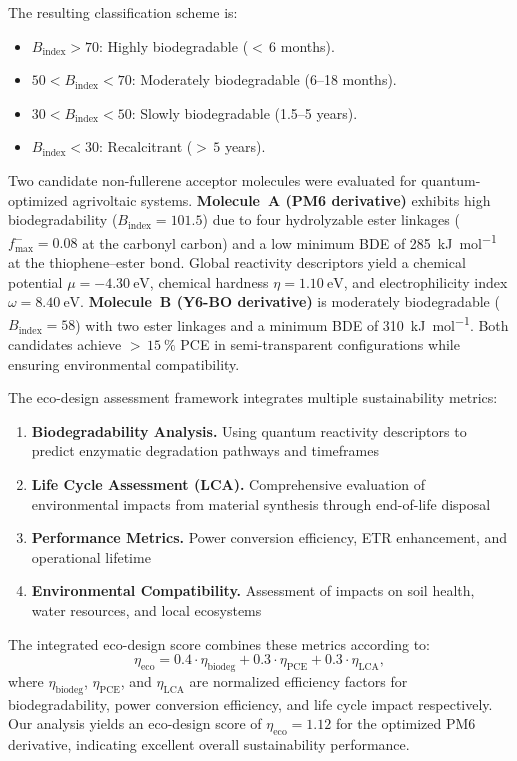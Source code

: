 \documentclass[11pt,a4paper]{article}
\begin{document}
The resulting classification scheme is:
\begin{itemize}
    \item $B_{\mathrm{index}} > 70$: Highly biodegradable (${<}\,6$ months).
    \item $50 < B_{\mathrm{index}} < 70$: Moderately biodegradable (6--18 months).
    \item $30 < B_{\mathrm{index}} < 50$: Slowly biodegradable (1.5--5 years).
    \item $B_{\mathrm{index}} < 30$: Recalcitrant (${>}\,5$ years).
\end{itemize}
Two candidate non-fullerene acceptor molecules were evaluated for quantum-optimized agrivoltaic systems. \textbf{Molecule~A (PM6 derivative)} exhibits high biodegradability ($B_{\mathrm{index}} = 101.5$) due to four hydrolyzable ester linkages ($f^-_{\mathrm{max}} = 0.08$ at the carbonyl carbon) and a low minimum BDE of \SI{285}{\kilo\joule\per\mole} at the thiophene--ester bond. Global reactivity descriptors yield a chemical potential $\mu = \SI{-4.30}{\electronvolt}$, chemical hardness $\eta = \SI{1.10}{\electronvolt}$, and electrophilicity index $\omega = \SI{8.40}{\electronvolt}$. \textbf{Molecule~B (Y6-BO derivative)} is moderately biodegradable ($B_{\mathrm{index}} = 58$) with two ester linkages and a minimum BDE of \SI{310}{\kilo\joule\per\mole}. Both candidates achieve ${>}\,\SI{15}{\percent}$ PCE in semi-transparent configurations while ensuring environmental compatibility.

The eco-design assessment framework integrates multiple sustainability metrics:
\begin{enumerate}
    \item \textbf{Biodegradability Analysis.} Using quantum reactivity descriptors to predict enzymatic degradation pathways and timeframes
    \item \textbf{Life Cycle Assessment (LCA).} Comprehensive evaluation of environmental impacts from material synthesis through end-of-life disposal
    \item \textbf{Performance Metrics.} Power conversion efficiency, ETR enhancement, and operational lifetime
    \item \textbf{Environmental Compatibility.} Assessment of impacts on soil health, water resources, and local ecosystems
\end{enumerate}
The integrated eco-design score combines these metrics according to:
\begin{equation}
\eta_{\mathrm{eco}} = 0.4 \cdot \eta_{\mathrm{biodeg}} + 0.3 \cdot \eta_{\mathrm{PCE}} + 0.3 \cdot \eta_{\mathrm{LCA}},
\end{equation}
where $\eta_{\mathrm{biodeg}}$, $\eta_{\mathrm{PCE}}$, and $\eta_{\mathrm{LCA}}$ are normalized efficiency factors for biodegradability, power conversion efficiency, and life cycle impact respectively. Our analysis yields an eco-design score of $\eta_{\mathrm{eco}} = 1.12$ for the optimized PM6 derivative, indicating excellent overall sustainability performance.
\end{document}
